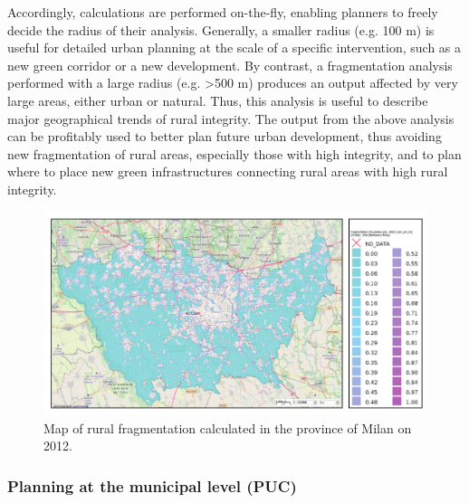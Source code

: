 \documentclass[APA,LATO1COL,doublespace]{WileyNJD-v2}
\begin{document}
Accordingly, calculations are performed on-the-fly, enabling planners to freely decide the radius of their analysis.
Generally, a smaller radius (e.g. 100 m) is useful for detailed urban planning at the scale of a specific intervention, such as a new green corridor or a new development.
By contrast, a fragmentation analysis performed with a large radius (e.g. >500 m) produces an output affected by very large areas, either urban or natural. 
Thus, this analysis is useful to describe major geographical trends of rural integrity.
The output from the above analysis can be profitably used to better plan future urban development, thus avoiding new fragmentation of rural areas, especially those with high integrity, and to plan where to place new green infrastructures connecting rural areas with high rural integrity.

\begin{figure}[t] %
    \centerline{\includegraphics[width=450pt]{06_caso_provinciale}}
    \caption{ Map of rural fragmentation calculated in the province of Milan on 2012. } \label{fig:casePROV}
\end{figure}


\subsubsection{ Planning at the municipal level (PUC) }
\label{sec:caseCOM}
\end{document}
